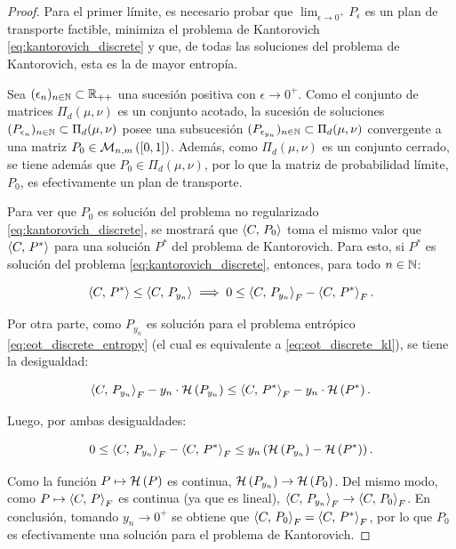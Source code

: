 \begin{proof}
	Para el primer límite, es necesario probar que $\lim_{\epsilon\to 0^+} P_\epsilon$ es un plan de transporte factible, minimiza el problema de Kantorovich \eqref{eq:kantorovich_discrete} y que, de todas las soluciones del problema de Kantorovich, esta es la de mayor entropía.

	Sea $(\epsilon_n)_{n\in\mathbb{N}}\subset\mathbb{R}_{++}$ una sucesión positiva con $\epsilon\to 0^+$. Como el conjunto de matrices $\Pi_d(\mu,\nu)$ es un conjunto acotado, la sucesión de soluciones $(P_{\epsilon_n})_{n\in\mathbb{N}}\subset\Pi_d(\mu,\nu)$ posee una subsucesión $(P_{\epsilon_{y_n}})_{n\in\mathbb{N}}\subset\Pi_d(\mu,\nu)$ convergente a una matriz $P_0\in\mathcal{M}_{n,m}\left([0,1]\right)$. Además, como $\Pi_d(\mu,\nu)$ es un conjunto cerrado, se tiene además que $P_0\in\Pi_d(\mu,\nu)$, por lo que la matriz de probabilidad límite, $P_0$, es efectivamente un plan de transporte.

	Para ver que $P_0$ es solución del problema no regularizado \eqref{eq:kantorovich_discrete}, se mostrará que $\left\langle C,\,P_0\right\rangle$ toma el mismo valor que $\left\langle C,\,P^*\right\rangle$ para una solución $P^*$ del problema de Kantorovich. Para esto, si $P^*$ es solución del problema \eqref{eq:kantorovich_discrete}, entonces, para todo $n\in\mathbb{N}$:

	\begin{equation*}
		\left\langle C,\,P^*\right\rangle \leq \left\langle C,\,P_{y_n}\right\rangle
		\implies
		0 \leq \left\langle C,\,P_{y_n}\right\rangle_F - \left\langle C,\,P^*\right\rangle_F .
	\end{equation*}

	Por otra parte, como $P_{y_n}$ es solución para el problema entrópico \eqref{eq:eot_discrete_entropy} (el cual es equivalente a \eqref{eq:eot_discrete_kl}), se tiene la desigualdad:

	\begin{equation*}
		\left\langle C,\,P_{y_n}\right\rangle_F - y_n\cdot\mathcal{H}\left(P_{y_n}\right)
		\leq \left\langle C,\,P^*\right\rangle_F - y_n\cdot\mathcal{H}\left(P^*\right).
	\end{equation*}

	Luego, por ambas desigualdades:

	\begin{equation}
		\label{eq:eot_convergence_proof}
		0 \leq \left\langle C,\,P_{y_n}\right\rangle_F - \left\langle C,\,P^*\right\rangle_F
		\leq y_n\left(\mathcal{H}\left(P_{y_n}\right) - \mathcal{H}\left(P^*\right)\right).
	\end{equation}

	Como la función $P\mapsto\mathcal{H}\left(P\right)$ es continua, $\mathcal{H}\left(P_{y_n}\right) \to \mathcal{H}\left(P_0\right)$. Del mismo modo, como $P\mapsto\left\langle C,\,P\right\rangle_F$ es continua (ya que es lineal), $\left\langle C,\,P_{y_n}\right\rangle_F\to\left\langle C,\,P_0\right\rangle_F$. En conclusión, tomando $y_n\to 0^+$ se obtiene que $\left\langle C,\,P_0\right\rangle_F = \left\langle C,\,P^*\right\rangle_F$, por lo que $P_0$ es efectivamente una solución para el problema de Kantorovich.


\end{proof}
